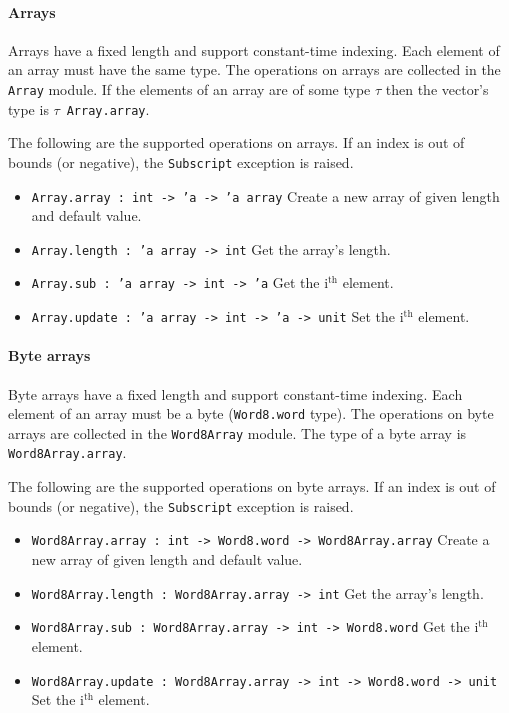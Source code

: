 \documentclass[12pt,a4paper]{book}
\begin{document}
\paragraph{Arrays}

Arrays have a fixed length and support constant-time indexing. Each element of an array must have the same type. The operations on arrays are collected in the \texttt{Array} module. If the elements of an array are of some type $\tau$ then the vector's type is $\tau$\ \texttt{Array.array}.

The following are the supported operations on arrays. If an index is out of bounds (or negative), the \texttt{Subscript} exception is raised.
\begin{itemize}
\item \texttt{Array.array : int -> 'a -> 'a array} Create a new array of given length and default value.
\item \texttt{Array.length : 'a array -> int} Get the array's length.
\item \texttt{Array.sub : 'a array -> int -> 'a} Get the i$^\textrm{th}$ element.
\item \texttt{Array.update : 'a array -> int -> 'a -> unit} Set the i$^\textrm{th}$ element.
\end{itemize}


\paragraph{Byte arrays}
Byte arrays have a fixed length and support constant-time indexing. Each element of an array must be a byte (\texttt{Word8.word} type). The operations on byte arrays are collected in the \texttt{Word8Array} module. The type of a byte array is \texttt{Word8Array.array}.

The following are the supported operations on byte arrays. If an index is out of bounds (or negative), the \texttt{Subscript} exception is raised.
\begin{itemize}
\item \texttt{Word8Array.array : int -> Word8.word -> Word8Array.array} Create a new array of given length and default value.
\item \texttt{Word8Array.length : Word8Array.array -> int} Get the array's length.
\item \texttt{Word8Array.sub : Word8Array.array -> int -> Word8.word} Get the i$^\textrm{th}$ element.
\item \texttt{Word8Array.update : Word8Array.array -> int -> Word8.word -> unit} Set the i$^\textrm{th}$ element.
\end{itemize}
\end{document}
